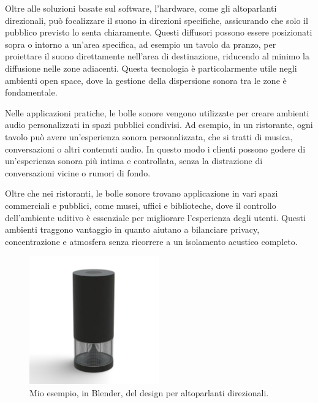 Oltre alle soluzioni basate sul software, l'hardware, come gli altoparlanti direzionali, può focalizzare il suono in direzioni specifiche, assicurando che solo il pubblico previsto lo senta chiaramente. Questi diffusori possono essere posizionati sopra o intorno a un'area specifica, ad esempio un tavolo da pranzo, per proiettare il suono direttamente nell'area di destinazione, riducendo al minimo la diffusione nelle zone adiacenti. Questa tecnologia è particolarmente utile negli ambienti open space, dove la gestione della dispersione sonora tra le zone è fondamentale.

Nelle applicazioni pratiche, le bolle sonore vengono utilizzate per creare ambienti audio personalizzati in spazi pubblici condivisi. Ad esempio, in un ristorante, ogni tavolo può avere un'esperienza sonora personalizzata, che si tratti di musica, conversazioni o altri contenuti audio. In questo modo i clienti possono godere di un'esperienza sonora più intima e controllata, senza la distrazione di conversazioni vicine o rumori di fondo. 

Oltre che nei ristoranti, le bolle sonore trovano applicazione in vari spazi commerciali e pubblici, come musei, uffici e biblioteche, dove il controllo dell'ambiente uditivo è essenziale per migliorare l'esperienza degli utenti. Questi ambienti traggono vantaggio in quanto aiutano a bilanciare privacy, concentrazione e atmosfera senza ricorrere a un isolamento acustico completo. \cite{cit-multiaudio}

\begin{figure}[H]
      \centering
      \includegraphics[width=0.5\textwidth]{Chapters/Figures/new_blender.png}
      \caption{\small Mio esempio, in Blender, del design per altoparlanti direzionali.}
      \label{fig:RT60}
\end{figure}